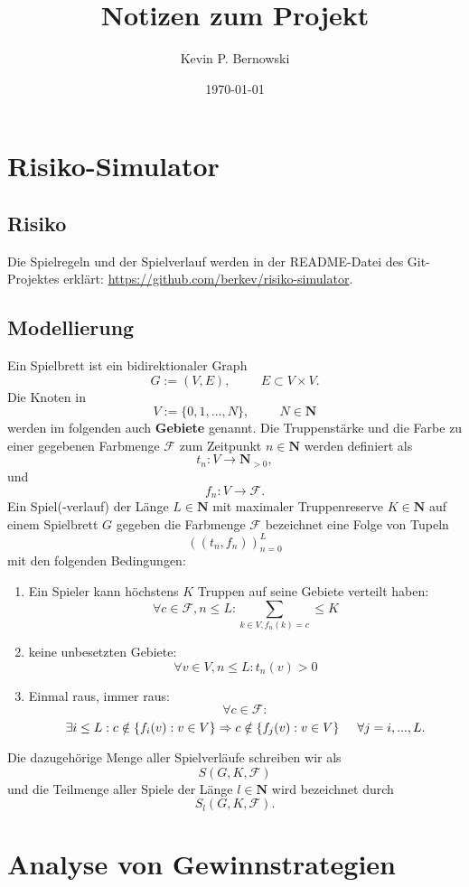 \documentclass[12pt, letterpaper]{article}
\title{Notizen zum Projekt}
\author{Kevin P. Bernowski}
\date{\today}
\begin{document}
\maketitle
\tableofcontents
\section{Risiko-Simulator}
    \subsection{Risiko}

    Die Spielregeln und der Spielverlauf werden in der README-Datei des Git-Projektes erklärt: \url{https://github.com/berkev/risiko-simulator}.

    
    \subsection{Modellierung}

    Ein Spielbrett ist ein bidirektionaler Graph 
    \[G := (V,E), \hspace{1cm} E\subset V\times V.\]
    Die Knoten in 
    \[V :=\{0,1,...,N\}, \hspace{1cm} N \in \mathbf{N} \]
    werden im folgenden auch \textbf{Gebiete} genannt.
    \newline
    Die Truppenstärke und die Farbe zu einer gegebenen Farbmenge $\mathcal{F}$ zum Zeitpunkt $n\in\mathbf{N}$ werden definiert als
    \[ t_{n}:V\rightarrow \mathbf{N}_{>0},
    \] und 
    \[ f_{n}:V\rightarrow \mathcal{F}.\]
    \newline
    Ein Spiel(-verlauf) der Länge $L\in\mathbf{N}$ mit maximaler Truppenreserve $K\in\mathbf{N}$ auf einem Spielbrett $G$ gegeben die Farbmenge $\mathcal{F}$  bezeichnet eine Folge von Tupeln 
    \[((t_{n},f_{n}))_{n=0}^{L}\]
    mit den folgenden Bedingungen:
    \begin{enumerate}
        \item Ein Spieler kann höchstens $K$ Truppen auf seine Gebiete verteilt haben:
        \[\forall c\in\mathcal{F},n\leq L: \sum_{k\in V, f_{n}(k)=c} \leq K\]
        \item keine unbesetzten Gebiete:
        \[\forall v \in V,n\leq L: t_{n}(v)>0\]
        \item Einmal raus, immer raus:
        \[\forall c\in \mathcal{F}:\]
        \[\exists i\leq L: c \notin \{f_{i}(v) : v\in V\} \Rightarrow c \notin \{f_{j}(v) : v\in V\}\hspace{5mm} \forall j=i,...,L.\]
    \end{enumerate}
    Die dazugehörige Menge aller Spielverläufe schreiben wir als
    \[ S(G,K,\mathcal{F}) \]
    und die Teilmenge aller Spiele der Länge $l\in\mathbf{N}$ wird bezeichnet durch
    \[S_{l}(G,K,\mathcal{F}).\]
        

    

    

\section{Analyse von Gewinnstrategien}
\end{document}
